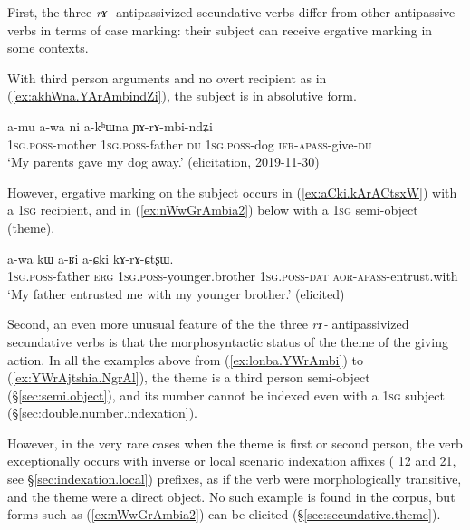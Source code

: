First, the three \textit{rɤ-} antipassivized secundative verbs differ from other antipassive verbs in terms of case marking: their subject can receive ergative marking in some contexts.  


With third person arguments and no overt recipient as in (\ref{ex:akhWna.YArAmbindZi}), the subject  is in absolutive form.

\begin{exe}
\ex \label{ex:akhWna.YArAmbindZi}
\gll a-mu a-wa ni a-kʰɯna ɲɤ-rɤ-mbi-ndʑi \\
\textsc{1sg}.\textsc{poss}-mother \textsc{1sg}.\textsc{poss}-father \textsc{du} \textsc{1sg}.\textsc{poss}-dog  \textsc{ifr}-\textsc{apass}-give-\textsc{du} \\
\glt `My parents gave my dog away.' (elicitation, 2019-11-30)
 \end{exe}
 
However, ergative marking on the subject occurs in (\ref{ex:aCki.kArACtsxW}) with a \textsc{1sg} recipient, and in (\ref{ex:nWwGrAmbia2}) below with a \textsc{1sg} semi-object (theme).
 
\begin{exe}
\ex \label{ex:aCki.kArACtsxW}
\gll a-wa kɯ a-ʁi a-ɕki kɤ-rɤ-ɕtʂɯ. \\
 \textsc{1sg}.\textsc{poss}-father \textsc{erg} \textsc{1sg}.\textsc{poss}-younger.brother \textsc{1sg}.\textsc{poss}-\textsc{dat} \textsc{aor}-\textsc{apass}-entrust.with \\
 \glt `My father entrusted me with my younger brother.' (elicited)
 \end{exe} 
 
Second, an even more unusual feature of the the three \textit{rɤ-} antipassivized secundative verbs is that the morphosyntactic status of the theme of the giving action. In all the examples above from (\ref{ex:lonba.YWrAmbi}) to (\ref{ex:YWrAjtshia.NgrAl}), the theme is a third person semi-object (§\ref{sec:semi.object}), and its number cannot be indexed even with a \textsc{1sg} subject  (§\ref{sec:double.number.indexation}).
 

However, in the very rare cases when the theme is first or second person, the verb    exceptionally occurs with inverse  or local scenario indexation affixes ( 1\fl{}2 and   2\fl{}1, see §\ref{sec:indexation.local}) prefixes, as if the verb were morphologically transitive, and the theme were a direct object. No such example is found in the corpus, but forms such as (\ref{ex:nWwGrAmbia2}) can be elicited (§\ref{sec:secundative.theme}).
 
